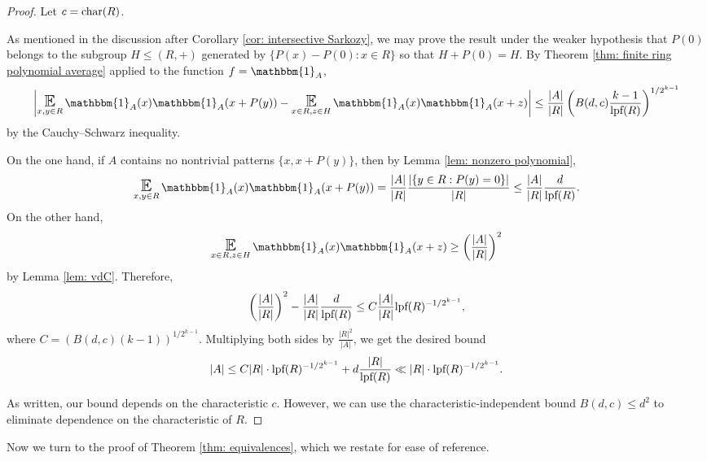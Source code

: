 \documentclass{amsart}
\theoremstyle{definition}
\numberwithin{equation}{section}
\newcommand{\lpf}{\normalfont\text{lpf}}
\DeclareMathOperator*{\E}{\text{\Large $\mathbb{E}$}}
\newcommand{\ind}{\mathbbm{1}}
\renewcommand{\char}{\textup{char}}
\begin{document}
\begin{proof}
    Let $c = \char(R)$.
    
    As mentioned in the discussion after Corollary \ref{cor: intersective Sarkozy}, we may prove the result under the weaker hypothesis that $P(0)$ belongs to the subgroup $H \le (R,+)$ generated by $\{P(x)-P(0) : x \in R\}$ so that $H + P(0) = H$.
    By Theorem \ref{thm: finite ring polynomial average} applied to the function $f = \ind_A$,
    \begin{equation*}
		\left| \E_{x,y \in R}{\ind_A(x) \ind_A(x + P(y))} - \E_{x \in R, z \in H}{\ind_A(x) \ind_A(x+z)} \right|
		 \le \frac{|A|}{|R|} \left( B(d,c) \frac{k-1}{\lpf(R)} \right)^{1/2^{k-1}}
	\end{equation*}
	by the Cauchy--Schwarz inequality.
	
	On the one hand, if $A$ contains no nontrivial patterns $\{x, x + P(y)\}$, then by Lemma \ref{lem: nonzero polynomial},
	\begin{equation*}
		\E_{x,y \in R}{\ind_A(x) \ind_A(x + P(y))} = \frac{|A|}{|R|} \frac{\left| \left\{ y \in R : P(y) = 0 \right\} \right|}{|R|}
		 \le \frac{|A|}{|R|} \frac{d}{\lpf(R)}.
	\end{equation*}
	On the other hand,
	\begin{equation*}
		\E_{x \in R, z \in H}{\ind_A(x) \ind_A(x+z)} \ge \left( \frac{|A|}{|R|} \right)^2
	\end{equation*}
	by Lemma \ref{lem: vdC}.
	Therefore,
	\begin{equation*}
		\left( \frac{|A|}{|R|} \right)^2 - \frac{|A|}{|R|} \frac{d}{\lpf(R)} \le C \frac{|A|}{|R|} \lpf(R)^{-1/2^{k-1}},
	\end{equation*}
	where $C = \left( B(d,c) (k-1) \right)^{1/2^{k-1}}$.
	Multiplying both sides by $\frac{|R|^2}{|A|}$, we get the desired bound
	\begin{equation*}
		|A| \le C |R| \cdot \lpf(R)^{-1/2^{k-1}} + d \frac{|R|}{\lpf(R)} \ll |R| \cdot \lpf(R)^{-1/2^{k-1}}.
	\end{equation*}

    As written, our bound depends on the characteristic $c$.
    However, we can use the characteristic-independent bound $B(d,c) \le d^2$ to eliminate dependence on the characteristic of $R$.
\end{proof}

Now we turn to the proof of Theorem \ref{thm: equivalences}, which we restate for ease of reference.

\Equivalences*
\end{document}
